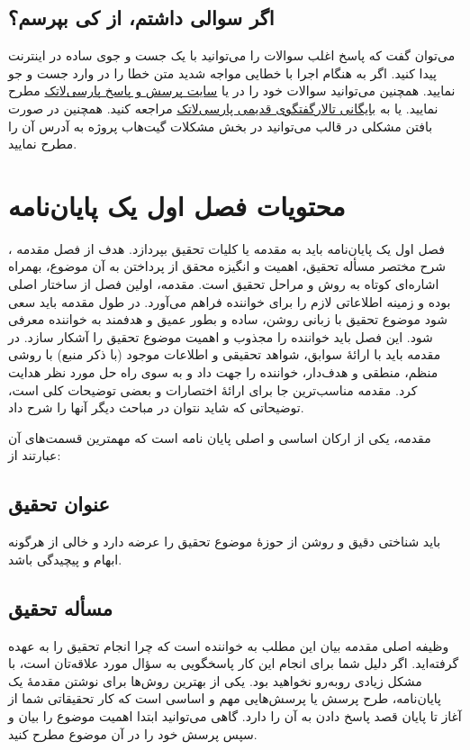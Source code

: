 \subsection{اگر سوالی داشتم، از کی بپرسم؟}
می‌توان گفت که پاسخ اغلب سوالات را می‌توانید با یک جست و جوی ساده در اینترنت پیدا کنید. اگر به هنگام اجرا با خطایی مواجه شدید متن خطا را در 
وارد جست و جو نمایید. همچنین می‌توانید سوالات خود را در 
یا
\href{http://qa.parsilatex.com}{سایت پرسش و پاسخ پارسی‌لاتک}%
مطرح نمایید.
یا به
\href{http://forum.parsilatex.com}{بایگانی تالارگفتگوی قدیمی پارسی‌لاتک}%
مراجعه کنید.
همچنین در صورت بافتن مشکلی در قالب می‌توانید در بخش مشکلات گیت‌هاب پروژه به آدرس 
آن را مطرح نمایید.

\section{محتویات فصل اول یک پایان‌نامه}
فصل اول یک پایان‌نامه باید به مقدمه یا کلیات تحقیق بپردازد.
هدف از فصل مقدمه%
،
شرح مختصر مسأله تحقیق، اهمیت و انگیزه محقق از پرداختن به آن موضوع، بهمراه اشاره‌ای کوتاه به روش و مراحل تحقیق است. مقدمه، اولین فصل از ساختار اصلی \پ بوده و زمینه اطلاعاتی لازم را برای خواننده فراهم می‌آورد. در طول مقدمه باید سعی شود موضوع تحقیق با زبانی روشن، ساده و بطور عمیق و هدفمند به خواننده معرفی شود. این فصل باید خواننده را مجذوب و اهمیت موضوع تحقیق را آشکار سازد. در مقدمه باید با ارائهٔ سوابق، شواهد تحقیقی و اطلاعات موجود (با ذکر منبع) با روشی منظم، منطقی و هدف‌دار، خواننده را جهت داد و به سوی راه حل مورد نظر هدایت کرد. مقدمه مناسب‌ترین جا برای ارائهٔ اختصارات و بعضی توضیحات کلی است، توضیحاتی که شاید نتوان در مباحث دیگر آنها را شرح داد.

مقدمه، یکی از ارکان اساسی و اصلی پایان نامه است که مهمترین قسمت‌های آن عبارتند از: 

\subsection{عنوان تحقیق} 
باید شناختی دقیق و روشن از حوزهٔ موضوع تحقیق را عرضه دارد و خالی از هرگونه ابهام و پیچیدگی باشد.

\subsection{مسأله تحقیق}
وظیفه اصلی مقدمه بیان این مطلب به خواننده است که چرا انجام تحقیق را به عهده گرفته‌اید. اگر دلیل شما برای انجام این کار پاسخگویی به سؤال مورد علاقه‌تان است، با مشکل زیادی روبه‌رو نخواهید بود. یکی از بهترین روش‌ها برای نوشتن مقدمهٔ یک پایان‌نامه، طرح پرسش یا پرسش‌هایی مهم و اساسی است که کار تحقیقاتی شما از آغاز تا پایان قصد پاسخ دادن به آن را دارد. گاهی می‌توانید ابتدا اهمیت موضوع را بیان و سپس پرسش خود را در آن موضوع مطرح کنید.

